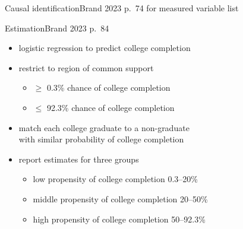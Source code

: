 \documentclass{beamer}
\begin{document}
\begin{frame}{Causal identification}{Brand 2023 p.~74 for measured variable list}


\end{frame}

\begin{frame}{Estimation}{Brand 2023 p.~84} \pause

\begin{itemize}
\item logistic regression to predict college completion \pause
\item restrict to region of common support
\begin{itemize}
\item $\geq$ 0.3\% chance of college completion
\item $\leq$ 92.3\% chance of college completion
\end{itemize}  \pause
\item match each college graduate to a non-graduate\\with similar probability of college completion  \pause
\item report estimates for three groups
\begin{itemize}
\item low propensity of college completion \hfill 0.3--20\%
\item middle propensity of college completion \hfill 20--50\%
\item high propensity of college completion \hfill 50--92.3\%
\end{itemize}
\end{itemize}

\end{frame}
\end{document}
